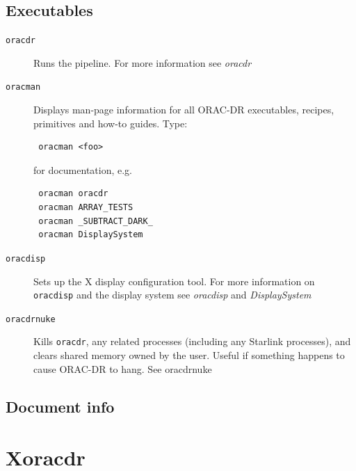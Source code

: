 \documentclass[twoside,11pt]{article}
\renewcommand{\_}{\texttt{\symbol{95}}}
\begin{document}
\subsection*{Executables\label{ORAC-DR_Components_Executables}}
\begin{description}

\item[\texttt{oracdr}] \mbox{}

Runs the pipeline. For more information see \emph{oracdr}


\item[\texttt{oracman}] \mbox{}

Displays man-page information for all ORAC-DR executables, recipes,
primitives and how-to guides. Type:

\begin{verbatim}
 oracman <foo>
\end{verbatim}


for documentation, e.g.

\begin{verbatim}
 oracman oracdr
 oracman ARRAY_TESTS
 oracman _SUBTRACT_DARK_
 oracman DisplaySystem
\end{verbatim}

\item[\texttt{oracdisp}] \mbox{}

Sets up the X display configuration tool. For more information on
\texttt{oracdisp} and the display system see \emph{oracdisp} and \emph{DisplaySystem}


\item[\texttt{oracdr\_nuke}] \mbox{}

Kills \texttt{oracdr}, any related processes (including any Starlink
processes), and clears shared memory owned by the user. Useful if
something happens to cause ORAC-DR to hang. See \textsf{oracdr\_nuke}

\end{description}
\subsection*{Document info\label{ORAC-DR_Components_Document_info}}

\section{Xoracdr\label{Xoracdr}}
\end{document}
